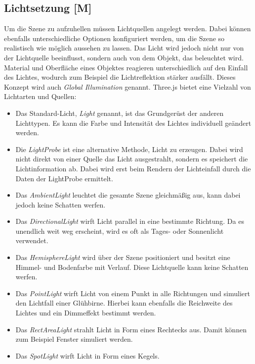 \newpage
\subsection{Lichtsetzung [M]}
\label{lichtsetzung}
Um die Szene zu aufzuhellen müssen Lichtquellen angelegt werden. Dabei können ebenfalls unterschiedliche Optionen konfiguriert werden, um die Szene so realistisch wie möglich aussehen zu lassen. Das Licht wird jedoch nicht nur von der Lichtquelle beeinflusst, sondern auch von dem Objekt, das beleuchtet wird. Material und Oberfläche eines Objektes reagieren unterschiedlich auf den Einfall des Lichtes, wodurch zum Beispiel die Lichtreflektion stärker ausfällt. Dieses Konzept wird auch \emph{Global Illumination} genannt. Three.js bietet eine Vielzahl von Lichtarten und Quellen:

\begin{itemize}
    \item Das Standard-Licht, \emph{Light} genannt, ist das Grundgerüst der anderen Lichttypen. Es kann die Farbe und Intensität des Lichtes individuell geändert werden. \cite{StandardLight}
    \item Die \emph{LightProbe} ist eine alternative Methode, Licht zu erzeugen. Dabei wird nicht direkt von einer Quelle das Licht ausgestrahlt, sondern es speichert die Lichtinformation ab. Dabei wird erst beim Rendern der Lichteinfall durch die Daten der LightProbe ermittelt.  \cite{LightProbe}
    \item Das \emph{AmbientLight} leuchtet die gesamte Szene gleichmäßig aus, kann dabei jedoch keine Schatten werfen. \cite{AmbientLight}
    \item Das \emph{DirectionalLight} wirft Licht parallel in eine bestimmte Richtung. Da es unendlich weit weg erscheint, wird es oft als Tages- oder Sonnenlicht verwendet. \cite{DirectionalLight}
    \item Das \emph{HemisphereLight} wird über der Szene positioniert und besitzt eine Himmel- und Bodenfarbe mit Verlauf. Diese Lichtquelle kann keine Schatten werfen. \cite{HemisphereLight}
    \item Das \emph{PointLight} wirft Licht von einem Punkt in alle Richtungen und simuliert den Lichtfall einer Glühbirne. Hierbei kann ebenfalls die Reichweite des Lichtes und ein Dimmeffekt bestimmt werden. \cite{PointLight}
    \item Das \emph{RectAreaLight} strahlt Licht in Form eines Rechtecks aus. Damit können zum Beispiel Fenster simuliert werden. \cite{ReactAreaLight}
    \item Das \emph{SpotLight} wirft Licht in Form eines Kegels. \cite{SpotLight}
\end{itemize}


